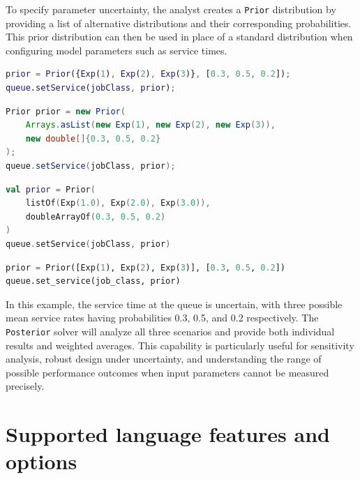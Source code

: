 To specify parameter uncertainty, the analyst creates a \texttt{Prior} distribution by providing a list of alternative distributions and their corresponding probabilities. This prior distribution can then be used in place of a standard distribution when configuring model parameters such as service times.

\begin{MATLAB}
\begin{lstlisting}[language = matlab]
prior = Prior({Exp(1), Exp(2), Exp(3)}, [0.3, 0.5, 0.2]);
queue.setService(jobClass, prior);
\end{lstlisting}
\end{MATLAB}
\begin{JAVA}
\begin{lstlisting}[language=java, basicstyle=\ttfamily\scriptsize]
Prior prior = new Prior(
    Arrays.asList(new Exp(1), new Exp(2), new Exp(3)),
    new double[]{0.3, 0.5, 0.2}
);
queue.setService(jobClass, prior);
\end{lstlisting}
\end{JAVA}
\begin{KOTLIN}
\begin{lstlisting}[language=kotlin, basicstyle=\ttfamily\scriptsize]
val prior = Prior(
    listOf(Exp(1.0), Exp(2.0), Exp(3.0)),
    doubleArrayOf(0.3, 0.5, 0.2)
)
queue.setService(jobClass, prior)
\end{lstlisting}
\end{KOTLIN}
\begin{PYTHON}
\begin{lstlisting}[language=python]
prior = Prior([Exp(1), Exp(2), Exp(3)], [0.3, 0.5, 0.2])
queue.set_service(job_class, prior)
\end{lstlisting}
\end{PYTHON}

In this example, the service time at the queue is uncertain, with three possible mean service rates having probabilities 0.3, 0.5, and 0.2 respectively. The \texttt{Posterior} solver will analyze all three scenarios and provide both individual results and weighted averages. This capability is particularly useful for sensitivity analysis, robust design under uncertainty, and understanding the range of possible performance outcomes when input parameters cannot be measured precisely.

\section{Supported language features and options}
